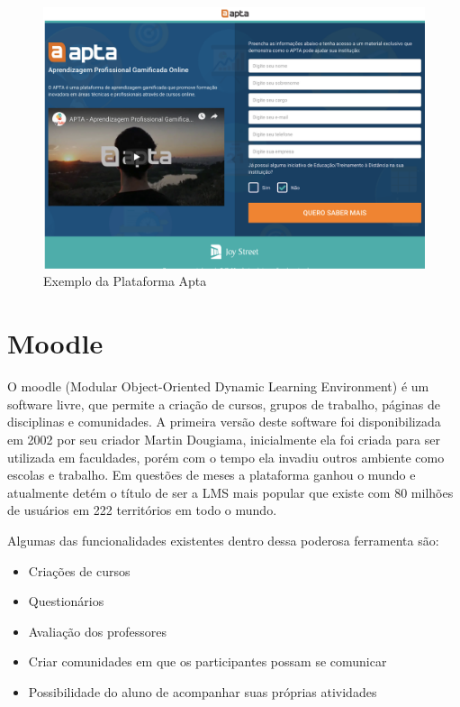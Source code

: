 \begin{figure}[htp]
\begin{center}
  \includegraphics[width=12cm]{images/trabalhos-relacionados-img/img2-Apta.png}
  \caption{Exemplo da Plataforma Apta}
  \label{fig:exampleApta}
\end{center}
\end{figure}


\section{Moodle}

O moodle (Modular Object-Oriented Dynamic Learning Environment) é um software livre, que permite a criação de cursos, grupos de trabalho, páginas de disciplinas e comunidades. A primeira versão deste software foi disponibilizada em 2002 por seu criador Martin Dougiama, inicialmente ela foi criada para ser utilizada em faculdades, porém com o tempo ela invadiu outros ambiente como escolas e trabalho. Em questões de meses a plataforma ganhou o mundo e atualmente detém o título de ser a LMS mais popular que existe com 80 milhões de usuários em 222 territórios em todo o mundo. 

Algumas das funcionalidades existentes dentro dessa poderosa ferramenta são:

\begin{itemize}
\item Criações de cursos
\item Questionários
\item Avaliação dos professores
\item Criar comunidades em que os participantes possam se comunicar
\item Possibilidade do aluno de acompanhar suas próprias atividades
\end{itemize}

